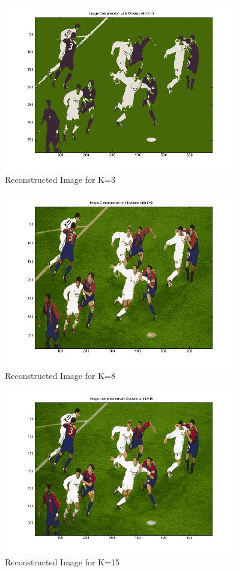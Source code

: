 \documentclass[paper=a4, fontsize=11pt]{scrartcl} %
\numberwithin{equation}{section} %
\numberwithin{figure}{section} %
\numberwithin{table}{section} %
\begin{document}
\subsection{}
\begin{figure}[h!]
  \centering
    \includegraphics[width=0.9\textwidth]{../figures/football_k3.png}
  \caption{Reconstructed Image for K=3}
\end{figure}

\begin{figure}[h!]
  \centering
    \includegraphics[width=0.9\textwidth]{../figures/football_k8.png}
  \caption{Reconstructed Image for K=8}
\end{figure}

\begin{figure}[h!]
  \centering
    \includegraphics[width=0.9\textwidth]{../figures/football_k15.png}
  \caption{Reconstructed Image for K=15}
\end{figure}
\end{document}
